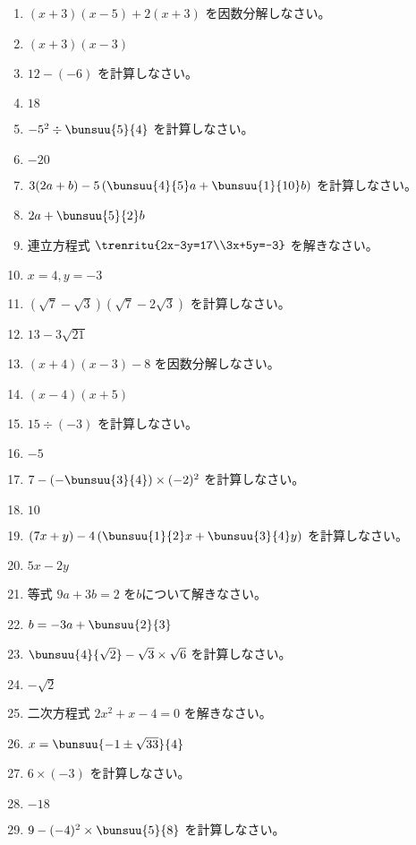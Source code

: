 \documentclass[uplatex,a4j,11pt]{jsreport}
\begin{document}
\begin{multicols}{2}
\begin{enumerate}
    \item $(x+3)(x-5)+2(x+3)$ を因数分解しなさい。%
    \item $(x+3)(x-3)$
    \item $12-(-6)$ を計算しなさい。%
    \item $18$
    \item $-5^2\div\bunsuu{5}{4}$ を計算しなさい。%
    \item $-20$
    \item $3(2a+b)-5\left(\bunsuu{4}{5}a+\bunsuu{1}{10}b\right)$ を計算しなさい。%
    \item $2a+\bunsuu{5}{2}b$
    \item 連立方程式 $\trenritu{2x-3y=17\\3x+5y=-3}$ を解きなさい。%
    \item $x=4, y=-3$
    \item $(\sqrt{7}-\sqrt{3})(\sqrt{7}-2\sqrt{3})$ を計算しなさい。%
    \item $13-3\sqrt{21}$
    \item $(x+4)(x-3)-8$ を因数分解しなさい。%
    \item $(x-4)(x+5)$
    \item $15\div(-3)$ を計算しなさい。%
    \item $-5$
    \item $7-\left(-\bunsuu{3}{4}\right)\times(-2)^2$ を計算しなさい。%
    \item $10$
    \item $(7x+y)-4\left(\bunsuu{1}{2}x+\bunsuu{3}{4}y\right)$ を計算しなさい。%
    \item $5x-2y$
    \item 等式 $9a+3b=2$ を$b$について解きなさい。%
    \item $b=-3a+\bunsuu{2}{3}$
    \item $\bunsuu{4}{\sqrt{2}}-\sqrt{3}\times\sqrt{6}$ を計算しなさい。%
    \item $-\sqrt{2}$
    \item 二次方程式 $2x^2+x-4=0$ を解きなさい。%
    \item $x=\bunsuu{-1\pm\sqrt{33}}{4}$
    \item $6\times(-3)$ を計算しなさい。%
    \item $-18$
    \item $9-(-4)^2\times\bunsuu{5}{8}$ を計算しなさい。%

\end{enumerate}
\end{multicols}
\end{document}
